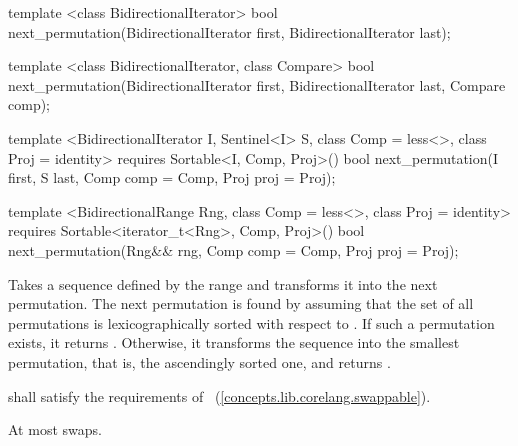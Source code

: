 %
\begin{removedblock}
\begin{itemdecl}
template <class BidirectionalIterator>
  bool next_permutation(BidirectionalIterator first,
                        BidirectionalIterator last);

template <class BidirectionalIterator, class Compare>
  bool next_permutation(BidirectionalIterator first,
                        BidirectionalIterator last, Compare comp);
\end{itemdecl}
\end{removedblock}
\begin{addedblock}
\begin{itemdecl}
template <BidirectionalIterator I, Sentinel<I> S, class Comp = less<>,
    class Proj = identity>
  requires Sortable<I, Comp, Proj>()
  bool next_permutation(I first, S last, Comp comp = Comp{}, Proj proj = Proj{});

template <BidirectionalRange Rng, class Comp = less<>,
    class Proj = identity>
  requires Sortable<iterator_t<Rng>, Comp, Proj>()
  bool
    next_permutation(Rng&& rng, Comp comp = Comp{}, Proj proj = Proj{});
\end{itemdecl}
\end{addedblock}

\begin{itemdescr}
\pnum
\effects
Takes a sequence defined by the range
and transforms it into the next permutation.
The next permutation is found by assuming that the set of all permutations is
lexicographically sorted with respect to
 .
If such a permutation exists, it returns
.
Otherwise, it transforms the sequence into the smallest permutation,
that is, the ascendingly sorted one, and returns
.

\begin{removedblock}
\pnum
\requires
{} shall satisfy the requirements of
~(\ref{concepts.lib.corelang.swappable}).
\end{removedblock}

\pnum
\complexity
At most
swaps.
\end{itemdescr}

